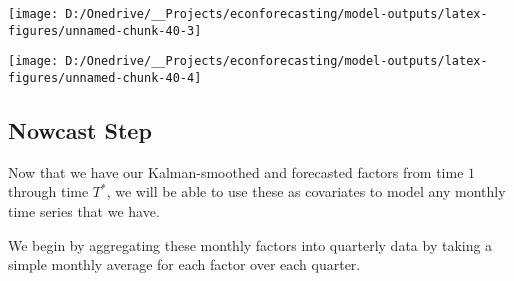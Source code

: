 \documentclass[11pt, letterpaper]{article}\usepackage[]{graphicx}\usepackage[]{color}
\begin{document}
{\centering \texttt{[image: D:/Onedrive/\_\_Projects/econforecasting/model-outputs/latex-figures/unnamed-chunk-40-3]} 

}




{\centering \texttt{[image: D:/Onedrive/\_\_Projects/econforecasting/model-outputs/latex-figures/unnamed-chunk-40-4]} 

}





\subsection{Nowcast Step}
Now that we have our Kalman-smoothed and forecasted factors from time $1$ through time $T^*$, we will be able to use these as covariates to model any monthly time series that we have.

We begin by aggregating these monthly factors into quarterly data by taking a simple monthly average for each factor over each quarter.
\end{document}
